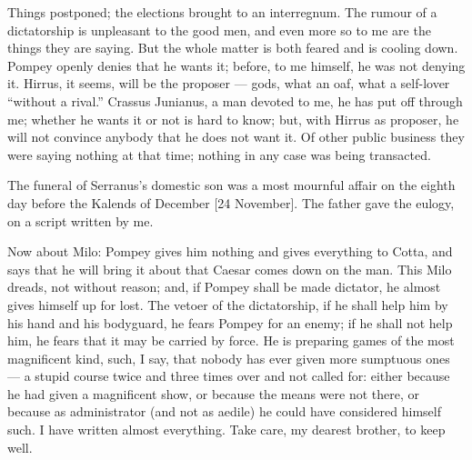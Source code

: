  Things postponed; the elections brought to an interregnum. The rumour of a dictatorship is unpleasant to the good men, and even more so to me are the things they are saying. But the whole matter is both feared and is cooling down. Pompey openly denies that he wants it; before, to me himself, he was not denying it. Hirrus, it seems, will be the proposer --- gods, what an oaf, what a self-lover ``without a rival.'' Crassus Junianus, a man devoted to me, he has put off through me; whether he wants it or not is hard to know; but, with Hirrus as proposer, he will not convince anybody that he does not want it. Of other public business they were saying nothing at that time; nothing in any case was being transacted.

 The funeral of Serranus's domestic son was a most mournful affair on the eighth day before the Kalends of December [24 November]. The father gave the eulogy, on a script written by me.

 Now about Milo: Pompey gives him nothing and gives everything to Cotta, and says that he will bring it about that Caesar comes down on the man. This Milo dreads, not without reason; and, if Pompey shall be made dictator, he almost gives himself up for lost. The vetoer of the dictatorship, if he shall help him by his hand and his bodyguard, he fears Pompey for an enemy; if he shall not help him, he fears that it may be carried by force. He is preparing games of the most magnificent kind, such, I say, that nobody has ever given more sumptuous ones --- a stupid course twice and three times over and not called for: either because he had given a magnificent show, or because the means were not there, or because as administrator (and not as aedile) he could have considered himself such. I have written almost everything. Take care, my dearest brother, to keep well.
